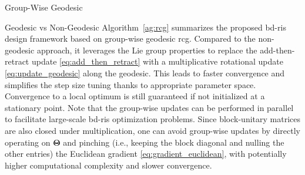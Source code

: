 \documentclass[journal]{IEEEtran}
\begin{document}
\begin{section}{Group-Wise Geodesic }
\begin{subsection}{Geodesic vs Non-Geodesic }
		Algorithm~\ref{ag:rcg} summarizes the proposed \gls{bd}-\gls{ris} design framework based on group-wise geodesic \gls{rcg}.
		Compared to the non-geodesic approach, it leverages the Lie group properties to replace the add-then-retract update \eqref{eq:add_then_retract} with a multiplicative rotational update \eqref{eq:update_geodesic} along the geodesic.
		This leads to faster convergence and simplifies the step size tuning thanks to appropriate parameter space.
		Convergence to a local optimum is still guaranteed if not initialized at a stationary point.
		Note that the group-wise updates can be performed in parallel to facilitate large-scale \gls{bd}-\gls{ris} optimization problems.
		Since block-unitary matrices are also closed under multiplication, one can avoid group-wise updates by directly operating on $\mathbf{\Theta}$ and pinching (i.e., keeping the block diagonal and nulling the other entries) the Euclidean gradient \eqref{eq:gradient_euclidean}, with potentially higher computational complexity and slower convergence.
	\end{subsection}
\end{section}
\end{document}
